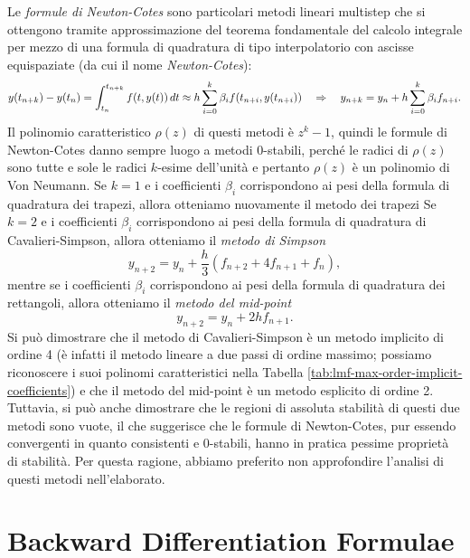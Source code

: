Le \emph{formule di Newton-Cotes} sono particolari metodi lineari multistep
che si ottengono tramite approssimazione del teorema fondamentale del
calcolo integrale per mezzo di una formula di quadratura di tipo interpolatorio
con ascisse equispaziate (da cui il nome \emph{Newton-Cotes}):
\[
y(t_{n+k}) - y(t_n)
= \int_{t_n}^{t_{n+k}} f(t,y(t)) \, dt
\approx h \sum_{i=0}^k \beta_i f(t_{n+i},y(t_{n+i}))
\quad \Rightarrow \quad
y_{n+k} = y_n + h \sum_{i=0}^k \beta_i f_{n+i}.
\]
Il polinomio caratteristico $\rho(z)$ di questi metodi è $z^k-1$, quindi
le formule di Newton-Cotes danno sempre luogo a metodi 0-stabili,
perché le radici di $\rho(z)$ sono tutte e sole le radici $k$-esime
dell'unità e pertanto $\rho(z)$ è un polinomio di Von Neumann.
Se $k=1$ e i coefficienti $\beta_i$ corrispondono ai pesi della formula
di quadratura dei trapezi, allora otteniamo nuovamente il metodo dei trapezi
Se $k=2$ e i coefficienti $\beta_i$ corrispondono ai pesi della formula
di quadratura di Cavalieri-Simpson, allora otteniamo il \emph{metodo di Simpson}
\[
y_{n+2} = y_n + \frac{h}{3} (f_{n+2} + 4 f_{n+1} + f_n),
\]
mentre se i coefficienti $\beta_i$ corrispondono ai pesi della formula
di quadratura dei rettangoli, allora otteniamo il \emph{metodo del mid-point}
\[
y_{n+2} = y_n + 2 h f_{n+1}.
\]
Si può dimostrare che il metodo di Cavalieri-Simpson è un metodo implicito
di ordine 4 (è infatti il metodo lineare a due passi di ordine massimo;
possiamo riconoscere i suoi polinomi caratteristici nella Tabella
\ref{tab:lmf-max-order-implicit-coefficients}) e che il metodo del mid-point
è un metodo esplicito di ordine 2. Tuttavia, si può anche dimostrare che
le regioni di assoluta stabilità di questi due metodi sono vuote,
il che suggerisce che le formule di Newton-Cotes, pur essendo convergenti
in quanto consistenti e 0-stabili, hanno in pratica pessime proprietà
di stabilità. Per questa ragione, abbiamo preferito non approfondire
l'analisi di questi metodi nell'elaborato.

\section{Backward Differentiation Formulae}

